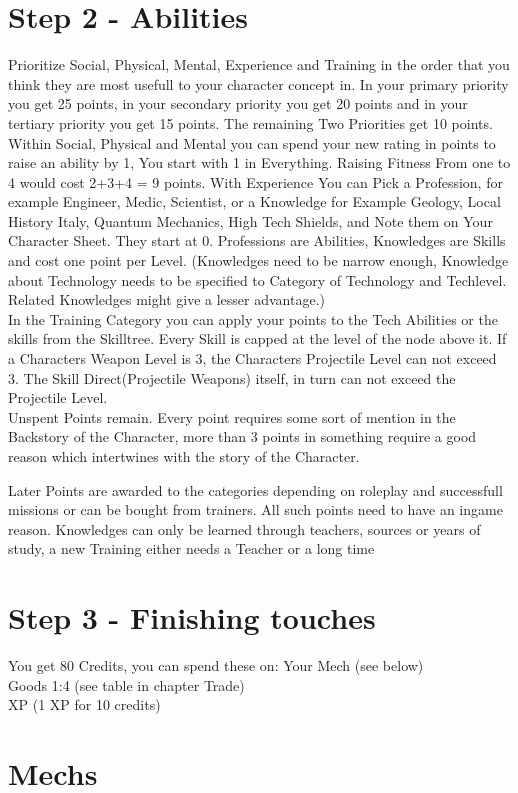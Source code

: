 \documentclass{book}
\begin{document}
    \section{Step 2 - Abilities}\label{sec:step2-abilities}
    Prioritize Social, Physical, Mental, Experience and Training in the order that you think they are most
    usefull to your character concept in. \newline
    In your primary priority you get 25 points, in your secondary priority you get 20 points and in your tertiary
    priority you get 15 points.
    The remaining Two Priorities get 10 points.\newline
    Within Social, Physical and Mental you can spend your new rating in points to raise an ability by 1, You start with 1
    in Everything.
    Raising Fitness From one to 4 would cost 2+3+4 = 9 points.\newline
    With Experience You can Pick a Profession, for example Engineer, Medic, Scientist, or a Knowledge for Example
    Geology, Local History Italy, Quantum Mechanics, High Tech Shields, and Note them on Your Character Sheet.
    They start at
    0.
    Professions are Abilities, Knowledges are Skills and cost one point per Level. (Knowledges need to be narrow enough,
    Knowledge about Technology needs to be specified to Category of Technology and Techlevel.
    Related Knowledges might give
    a lesser advantage.)\\

    In the Training Category you can apply your points to the Tech Abilities or the skills from the Skilltree.
    Every Skill is capped at the level of the node above it.
    If a Characters Weapon Level is 3, the Characters Projectile
    Level can not exceed 3.
    The Skill Direct(Projectile Weapons) itself, in turn can not exceed the Projectile Level.\\


    Unspent Points remain.
    Every point requires some sort of mention in the Backstory of the Character, more than 3 points
    in something require a good reason which intertwines with the story of the Character.

    Later Points are awarded to the categories depending on roleplay and successfull missions or can be bought from
    trainers.
    All such points need to have an ingame reason.
    Knowledges can only be learned through teachers, sources or
    years of study, a new Training either needs a Teacher or a long time\\


    \section{Step 3 - Finishing touches}\label{sec:step3-finishingtouches}
    You get 80 Credits, you can spend these on:
    Your Mech (see below)\\
    Goods 1:4 (see table in chapter Trade)\\
    XP (1 XP for 10 credits)\\

    \section{Mechs}\label{sec:mechs}
    
\end{document}
